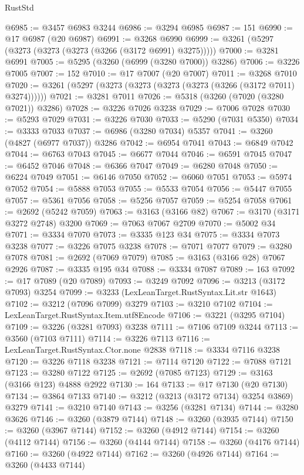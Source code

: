 \begin{lexlean}{RustStd}
\begin{coremodule}
{\begin{coremodule}
{{{{{{{{{{{{{{{{{{{{{{{{{{@6985 := @3457 @6983 @3244
@6986 := @3294 @6985
@6987 := 151
@6990 := @17 @6987 (@20 @6987)
@6991 := @3268 @6990
@6999 := @3261 (@5297 (@3273 (@3273 (@3273 (@3266 (@3172 @6991) @3275)))))
@7000 := @3281 @6991
@7005 := @5295 (@3260 (@6999 (@3280 @7000)) @3286)
@7006 := @3226 @7005
@7007 := 152
@7010 := @17 @7007 (@20 @7007)
@7011 := @3268 @7010
@7020 := @3261 (@5297 (@3273 (@3273 (@3273 (@3273 (@3266 (@3172 @7011) @3274))))))
@7021 := @3281 @7011
@7026 := @5318 (@3260 (@7020 (@3280 @7021)) @3286)
@7028 := @3226 @7026 @3238
@7029 := @7006 @7028
@7030 := @5293 @7029
@7031 := @3226 @7030
@7033 := @5290 (@7031 @5350)
@7034 := @3333 @7033
@7037 := @6986 (@3280 @7034) @5357
@7041 := @3260 (@4827 (@6977 @7037)) @3286
@7042 := @6954 @7041
@7043 := @6849 @7042
@7044 := @6763 @7043
@7045 := @6677 @7044
@7046 := @6591 @7045
@7047 := @6452 @7046
@7048 := @6366 @7047
@7049 := @6280 @7048
@7050 := @6224 @7049
@7051 := @6146 @7050
@7052 := @6060 @7051
@7053 := @5974 @7052
@7054 := @5888 @7053
@7055 := @5533 @7054
@7056 := @5447 @7055
@7057 := @5361 @7056
@7058 := @5256 @7057
@7059 := @5254 @7058
@7061 := @2692 (@5242 @7059)
@7063 := @3163 (@3166 @82)
@7067 := @3170 (@3171 @3272 @2748) @3200
@7069 := @7063 @7067 @2709
@7070 := @5002 @34
@7071 := @3334 @7070
@7073 := @3335 @123 @34
@7075 := @3334 @7073 @3238
@7077 := @3226 @7075 @3238
@7078 := @7071 @7077
@7079 := @3280 @7078
@7081 := @2692 (@7069 @7079)
@7085 := @3163 (@3166 @28) @7067 @2926
@7087 := @3335 @195 @34
@7088 := @3334 @7087
@7089 := 163
@7092 := @17 @7089 (@20 @7089)
@7093 := @3249 @7092
@7096 := @3213 (@3172 @7093) @3254
@7099 := @3233 (LexLeanTarget.RustSyntax.Lit.str @1643)
@7102 := @3212 (@7096 @7099) @3279
@7103 := @3210 @7102
@7104 := LexLeanTarget.RustSyntax.Item.utf8Encode
@7106 := @3221 (@3295 @7104)
@7109 := @3226 (@3281 @7093) @3238
@7111 := @7106 @7109 @3244
@7113 := @3560 (@7103 @7111)
@7114 := @3226 @7113
@7116 := LexLeanTarget.RustSyntax.Ctor.none @2838
@7118 := @3334 @7116 @3238
@7120 := @3226 @7118 @3238
@7121 := @7114 @7120
@7122 := @7088 @7121
@7123 := @3280 @7122
@7125 := @2692 (@7085 @7123)
@7129 := @3163 (@3166 @123) @4888 @2922
@7130 := 164
@7133 := @17 @7130 (@20 @7130)
@7134 := @3864 @7133
@7140 := @3212 (@3213 (@3172 @7134) @3254 @3869) @3279
@7141 := @3210 @7140
@7143 := @3256 (@3281 @7134)
@7144 := @3280 @3626
@7146 := @3260 (@3879 @7144)
@7148 := @3260 (@3935 @7144)
@7150 := @3260 (@3967 @7144)
@7152 := @3260 (@4912 @7144)
@7154 := @3260 (@4112 @7144)
@7156 := @3260 (@4144 @7144)
@7158 := @3260 (@4176 @7144)
@7160 := @3260 (@4922 @7144)
@7162 := @3260 (@4926 @7144)
@7164 := @3260 (@4433 @7144)
}}}}}}}}}}}}}}}}}}}}}}}}}}
\end{coremodule}}
\end{coremodule}
\end{lexlean}
